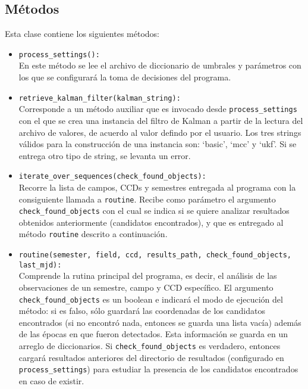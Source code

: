 \subsection{M\'etodos}

Esta clase contiene los siguientes m\'etodos:
\begin{itemize}
\item \texttt{process\_settings():}\\
En este m\'etodo se lee el archivo de diccionario de umbrales y par\'ametros con los que se configurar\'a la toma de decisiones del programa.
\bigskip

\item \texttt{retrieve\_kalman\_filter(kalman\_string):}\\
Corresponde a un m\'etodo auxiliar que es invocado desde \texttt{process\_settings} con el que se crea una instancia del filtro de Kalman a partir de la lectura del archivo de valores, de acuerdo al valor defindo por el usuario. Los tres strings v\'alidos para la construcci\'on de una instancia son: `basic', `mcc' y `ukf'. Si se entrega otro tipo de string, se levanta un error.
\bigskip
  
\item \texttt{iterate\_over\_sequences(check\_found\_objects):}\\
Recorre la lista de campos, CCDs y semestres entregada al programa con la consiguiente llamada a \texttt{routine}. Recibe como par\'ametro el argumento \texttt{check\_found\_objects} con el cual se indica si se quiere analizar resultados obtenidos anteriormente (candidatos encontrados), y que es entregado al m\'etodo \texttt{routine} descrito a continuaci\'on.
\bigskip

\item \texttt{routine(semester, field, ccd, results\_path, check\_found\_objects, last\_mjd):}\\
Comprende la rutina principal del programa, es decir, el an\'alisis de las observaciones de un semestre, campo y CCD espec\'ifico. El argumento \texttt{check\_found\_objects} es un boolean e indicar\'a el modo de ejecuci\'on del m\'etodo: si es falso, s\'olo guardar\'a las coordenadas de los candidatos encontrados (si no encontr\'o nada, entonces se guarda una lista vac\'ia) adem\'as de las \'epocas en que fueron detectados. Esta informaci\'on se guarda en un arreglo de diccionarios. Si \texttt{check\_found\_objects} es verdadero, entonces cargar\'a resultados anteriores del directorio de resultados (configurado en \texttt{process\_settings}) para estudiar la presencia de los candidatos encontrados en caso de existir.
\end{itemize}  
\bigskip
   

